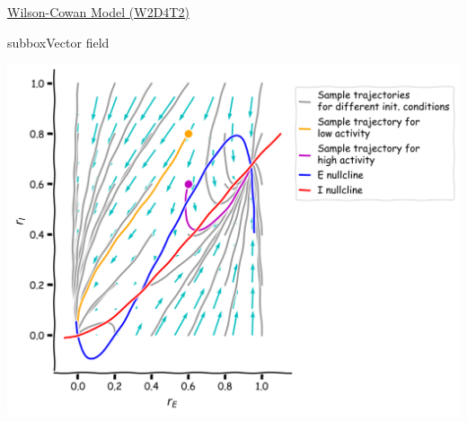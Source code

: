 \begin{textbox}{\href{https://compneuro.neuromatch.io/tutorials/W2D4_DynamicNetworks/chapter_title.html}{Wilson-Cowan Model (W2D4T2)} }
\begin{subbox}{subbox}{Vector field}
\begin{center}
\includegraphics[scale=0.15]{Figures/DN/DN_Figure10.png}
\end{center}

\end{subbox}
\end{textbox}